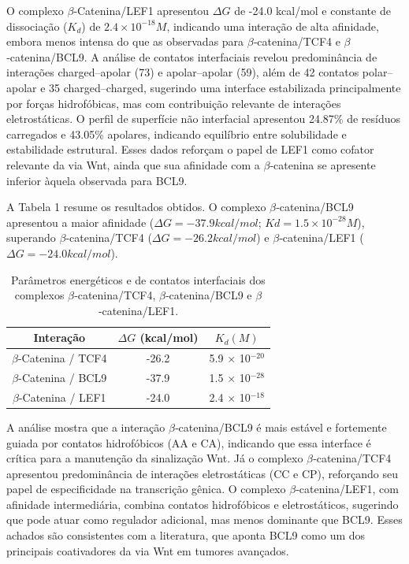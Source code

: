 O complexo $\beta$‑Catenina/LEF1 apresentou $\Delta G$ de -24.0 kcal/mol e constante de dissociação
($K_d$) de $2.4 \times 10^{-18} M$, indicando uma interação de alta afinidade, embora menos intensa do
que as observadas para $\beta$‑catenina/TCF4 e $\beta$‑catenina/BCL9. A análise de contatos
interfaciais revelou predominância de interações charged–apolar (73) e apolar–apolar (59),
além de 42 contatos polar–apolar e 35 charged–charged, sugerindo uma interface
estabilizada principalmente por forças hidrofóbicas, mas com contribuição relevante de
interações eletrostáticas. O perfil de superfície não interfacial apresentou 24.87\% de
resíduos carregados e 43.05\% apolares, indicando equilíbrio entre solubilidade e
estabilidade estrutural. Esses dados reforçam o papel de LEF1 como cofator relevante da
via Wnt, ainda que sua afinidade com a $\beta$‑catenina se apresente inferior àquela observada
para BCL9.

A Tabela 1 resume os resultados obtidos. O complexo $\beta$‑catenina/BCL9 apresentou a maior
afinidade ($\Delta G = -37.9 kcal/mol$; $Kd = 1.5 \times 10^{-28} M$), superando $\beta$‑catenina/TCF4 ($\Delta G =
-26.2 kcal/mol$) e $\beta$‑catenina/LEF1 ($\Delta G = -24.0 kcal/mol$).

\begin{table}[H]
    \centering
    \caption{ Parâmetros energéticos e de contatos interfaciais dos complexos $\beta$‑catenina/TCF4, $\beta$‑catenina/BCL9 e $\beta$‑catenina/LEF1.}
    \begin{tabular}{ccc}
    \hline 
     Interação    & $\Delta G$ (kcal/mol)  & $K_d (M)$   \\ \hline

    $\beta$-Catenina / TCF4 & -26.2 & 5.9 $\times$ 10$^{-20}$  \\
    $\beta$-Catenina / BCL9 & -37.9 & 1.5 $\times$ 10$^{-28}$ \\
   $\beta$-Catenina / LEF1 & -24.0 & 2.4 $\times$ 10$^{-18}$  \\ \hline
    \end{tabular}
    \label{tab:my_label}
\end{table}

A análise mostra que a interação $\beta$‑catenina/BCL9 é mais estável e fortemente guiada por
contatos hidrofóbicos (AA e CA), indicando que essa interface é crítica para a manutenção
da sinalização Wnt. Já o complexo $\beta$‑catenina/TCF4 apresentou predominância de
interações eletrostáticas (CC e CP), reforçando seu papel de especificidade na transcrição
gênica. O complexo $\beta$‑catenina/LEF1, com afinidade intermediária, combina contatos
hidrofóbicos e eletrostáticos, sugerindo que pode atuar como regulador adicional, mas
menos dominante que BCL9. Esses achados são consistentes com a literatura, que aponta
BCL9 como um dos principais coativadores da via Wnt em tumores avançados.

